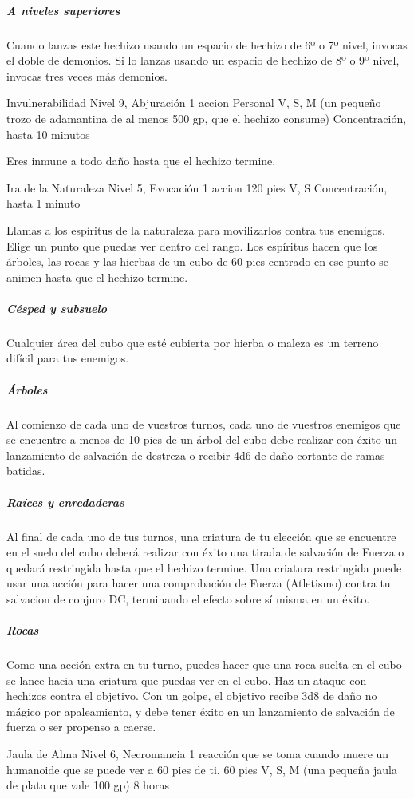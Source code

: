 \documentclass[a4paper,twocolumn,openany,10pt]{dndbook}
\begin{document}
	\subparagraph{A niveles superiores} Cuando lanzas este hechizo usando un espacio de hechizo de 6º o 7º nivel, invocas el
	doble de demonios. Si lo lanzas usando un espacio de hechizo de 8º o 9º nivel, invocas tres veces más demonios. 

\spellheader%
	{Invulnerabilidad}
	{Nivel 9, Abjuración}
	{1 accion}
	{Personal}
	{V, S, M (un pequeño trozo de adamantina de al menos 500 gp, que el hechizo consume)}
	{Concentración, hasta 10 minutos}
	
	Eres inmune a todo daño hasta que el hechizo termine. 

\spellheader%
	{Ira de la Naturaleza}
	{Nivel 5, Evocación}
	{1 accion}
	{120 pies}
	{V, S}
	{Concentración, hasta 1 minuto}
	
	Llamas a los espíritus de la naturaleza para movilizarlos contra tus enemigos. Elige un punto que puedas ver dentro del
	rango. Los espíritus hacen que los árboles, las rocas y las hierbas de un cubo de 60 pies centrado en ese punto se animen
	hasta que el hechizo termine.
	
	\subparagraph{Césped y subsuelo} Cualquier área del cubo que esté cubierta por hierba o maleza es un terreno difícil para
	tus enemigos.
	
	\subparagraph{Árboles} Al comienzo de cada uno de vuestros turnos, cada uno de vuestros enemigos que se encuentre a menos de
	10 pies de un árbol del cubo debe realizar con éxito un lanzamiento de salvación de destreza o recibir 4d6 de daño cortante
	de ramas batidas.
	
	\subparagraph{Raíces y enredaderas} Al final de cada uno de tus turnos, una criatura de tu elección que se encuentre en el
	suelo del cubo deberá realizar con éxito una tirada de salvación de Fuerza o quedará restringida hasta que el hechizo
	termine. Una criatura restringida puede usar una acción para hacer una comprobación de Fuerza (Atletismo) contra tu
	salvacion de conjuro DC, terminando el efecto sobre sí misma en un éxito.
	
	\subparagraph{Rocas} Como una acción extra en tu turno, puedes hacer que una roca suelta en el cubo se lance hacia una
	criatura que puedas ver en el cubo. Haz un ataque con hechizos contra el objetivo. Con un golpe, el objetivo recibe 3d8 de
	daño no mágico por apaleamiento, y debe tener éxito en un lanzamiento de salvación de fuerza o ser propenso a caerse. 

\spellheader%
	{Jaula de Alma}
	{Nivel 6, Necromancia}
	{1 reacción que se toma cuando muere un humanoide que se puede ver a 60 pies de ti.}
	{60 pies}
	{V, S, M (una pequeña jaula de plata que vale 100 gp)}
	{8 horas}
	
\end{document}

